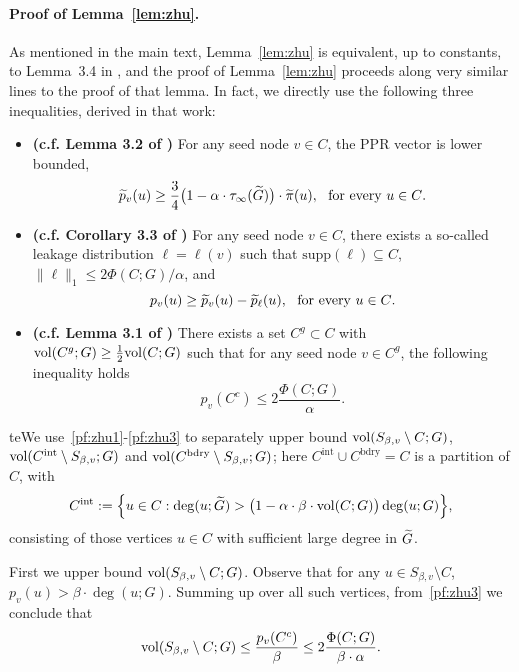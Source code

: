\paragraph{Proof of Lemma~\ref{lem:zhu}.}
As mentioned in the main text, Lemma~\ref{lem:zhu} is equivalent, up to constants, to Lemma~3.4 in \cite{zhu2013}, and the proof of Lemma~\ref{lem:zhu} proceeds along very similar lines to the proof of that lemma. In fact, we directly use the following three inequalities, derived in that work:
\begin{itemize}
	\item \textbf{(c.f. Lemma 3.2 of \cite{zhu2013})} For any seed node $v \in C$, the PPR vector is lower bounded,
	\begin{equation}
	\label{pf:zhu1}
	\widetilde{p}_v(u) \geq \frac{3}{4}\bigl(1 - \alpha \cdot \tau_{\infty}(\widetilde{G})\bigr) \cdot \widetilde{\pi}(u),~~\textrm{for every $u \in C$.}
	\end{equation}
	\item \textbf{(c.f. Corollary 3.3 of \cite{zhu2013})} For any seed node $v \in C$, there exists a so-called leakage distribution $\ell = \ell(v)$ such that $\mathrm{supp}(\ell) \subseteq C$, $\|\ell\|_1 \leq 2\Phi(C;G)/\alpha$, and 
	\begin{equation}
	\label{pf:zhu2}
	p_v(u) \geq \widetilde{p}_v(u) - \widetilde{p}_{\ell}(u),~~\textrm{for every $u \in C$.}
	\end{equation}
	\item \textbf{(c.f. Lemma 3.1 of \cite{zhu2013})} There exists a set $C^g \subset C$ with $\mathrm{vol}(C^g;G) \geq \frac{1}{2}\mathrm{vol}(C;G)$ such that for any seed node $v \in C^g$, the following inequality holds
	\begin{equation}
	\label{pf:zhu3}
	p_v(C^c) \leq 2\frac{\Phi(C;G)}{\alpha}.
	\end{equation}
\end{itemize}
teWe use~\eqref{pf:zhu1}-\eqref{pf:zhu3} to separately upper bound $\mathrm{vol}(S_{\beta,v} \setminus C;G)$, $\mathrm{vol}(C^{\mathrm{int}} \setminus S_{\beta,v};G)$ and $\mathrm{vol}(C^{\mathrm{bdry}} \setminus S_{\beta,v};G)$; here $C^{\mathrm{int}} \cup C^{\mathrm{bdry}} = C$ is a partition of $C$, with
\begin{equation*}
C^{\mathrm{int}} := \Bigl\{u \in C: \deg(u;\widetilde{G}) > \bigl(1 - \alpha \cdot \beta \cdot \mathrm{vol}(C;G)\bigr) \deg(u;G) \Bigr\},
\end{equation*}
consisting of those vertices $u \in C$ with sufficient large degree in $\widetilde{G}$. 

First we upper bound $\mathrm{vol}(S_{\beta,v} \setminus C;G)$. Observe that for any $u \in S_{\beta,v} \setminus C$, $p_v(u) > \beta \cdot \deg(u;G)$. Summing up over all such vertices, from~\eqref{pf:zhu3} we conclude that
\begin{equation}
\label{pf:zhu3.5}
\mathrm{vol}(S_{\beta,v} \setminus C; G) \leq \frac{p_v(C^c)}{\beta} \leq 2\frac{\Phi(C;G)}{\beta \cdot \alpha}.
\end{equation} 

